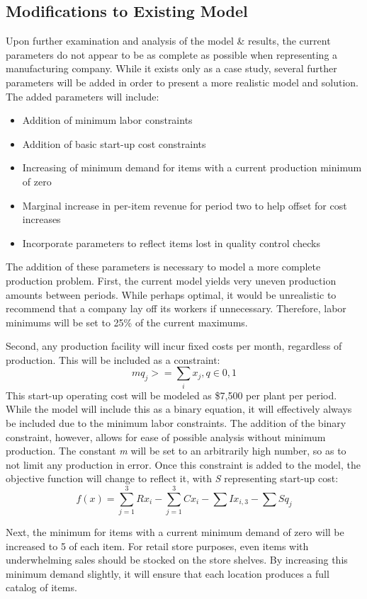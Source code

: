 \documentclass{article}
\begin{document}
\subsection{Modifications to Existing Model}
Upon further examination and analysis of the model \& results, the current parameters do not appear to be as complete as possible when representing a manufacturing company.  While it exists only as a case study, several further parameters will be added in order to present a more realistic model and solution.  The added parameters will include:
\begin{itemize}
	\item Addition of minimum labor constraints
	\item Addition of basic start-up cost constraints
	\item Increasing of minimum demand for items with a current production minimum of zero
	\item Marginal increase in per-item revenue for period two to help offset for cost increases
	\item Incorporate parameters to reflect items lost in quality control checks
\end{itemize}
The addition of these parameters is necessary to model a more complete production problem.  First, the current model yields very uneven production amounts between periods.  While perhaps optimal, it would be unrealistic to recommend that a company lay off its workers if unnecessary.  Therefore, labor minimums will be set to 25\% of the current maximums.
\par
Second, any production facility will incur fixed costs per month, regardless of production.  This will be included as a constraint:
$$ mq_{j} >= \sum_{i} x_{j}, q\in {0,1} $$
This start-up operating cost will be modeled as \$7,500 per plant per period.  While the model will include this as a binary equation, it will effectively always be included due to the minimum labor constraints.  The addition of the binary constraint, however, allows for ease of possible analysis without minimum production.  The constant \textit{m} will be set to an arbitrarily high number, so as to not limit any production in error.  Once this constraint is added to the model, the objective function will change to reflect it, with \textit{S} representing start-up cost:
$$f(x) = \sum_{j=1}^{3}Rx_{i} - \sum_{j=1}^{3}Cx_{i} - \sum Ix_{i,3} -\sum Sq_{j}$$
\par
Next, the minimum for items with a current minimum demand of zero will be increased to 5 of each item.  For retail store purposes, even items with underwhelming sales should be stocked on the store shelves.  By increasing this minimum demand slightly, it will ensure that each location produces a full catalog of items.  
\end{document}
